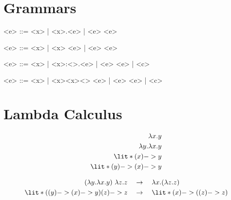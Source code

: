 \documentclass[11hpt]{article}
\begin{document}
\section{Grammars}

\begin{grammar}
<e> ::= <x> | <\lambda x>.<e> | <e> <e>
\end{grammar}

\begin{grammar}
<e> ::= <x> | \lit*{(}<x>\lit*{) ->} <e> | <e> <e>
\end{grammar}

\begin{grammar}
<e> ::= <x> | <\lambda x>:<\tau>.<e> | <e> <e> | <c>
\end{grammar}

\begin{grammar}
<e> ::= <x> | \lit*{(}<x><x>\lit*{,}<\tau>\lit*{);} <e> | <e> <e> | <c>
\end{grammar}

\section{Lambda Calculus}

\begin{align*}
\lambda x.y \\
\lambda y.\lambda x.y \\
\lit*{(x) -> y} \\
\lit*{(y) -> (x) -> y}
\end{align*}

\begin{align*}
(\lambda y.\lambda x.y) \ \lambda z.z \quad &\rightarrow \quad \lambda x.(\lambda z.z) \\
\lit*{((y) -> (x) -> y) (z) -> z} \quad &\rightarrow \quad \lit*{(x) -> ((z) -> z)}
\end{align*}
\end{document}
